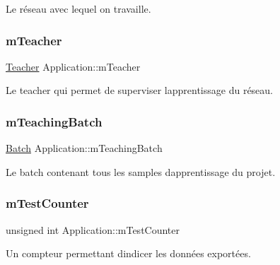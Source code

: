 Le réseau avec lequel on travaille. 

\mbox{\label{classApplication_aabafc2a40d05198496fed23f6fe1ea1f}} 
\subsubsection{\texorpdfstring{m\+Teacher}{mTeacher}}
{\footnotesize\ttfamily \hyperlink{classTeacher}{Teacher} Application\+::m\+Teacher\hspace{0.3cm}{\ttfamily [private]}}



Le teacher qui permet de superviser l\textquotesingle{}apprentissage du réseau. 

\mbox{\label{classApplication_a2ccd850b23693fd6d76cad0975a597dd}} 
\subsubsection{\texorpdfstring{m\+Teaching\+Batch}{mTeachingBatch}}
{\footnotesize\ttfamily \hyperlink{classApplication_a9888f02149ca3b8ffa499ee07426cd1d}{Batch} Application\+::m\+Teaching\+Batch\hspace{0.3cm}{\ttfamily [private]}}



Le batch contenant tous les samples d\textquotesingle{}apprentissage du projet. 

\mbox{\label{classApplication_a3ee8257a9c7ece037ee91b68d9841002}} 
\subsubsection{\texorpdfstring{m\+Test\+Counter}{mTestCounter}}
{\footnotesize\ttfamily unsigned int Application\+::m\+Test\+Counter\hspace{0.3cm}{\ttfamily [private]}}



Un compteur permettant d\textquotesingle{}indicer les données exportées. 

